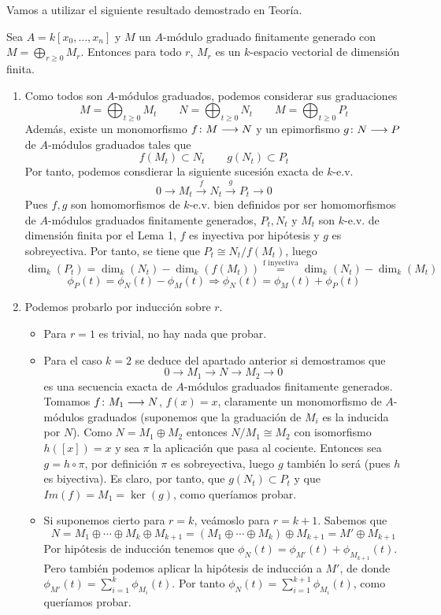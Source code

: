 \documentclass[twoside]{article}
\begin{document}
\begin{solucion}Vamos a utilizar el siguiente resultado demostrado en Teoría.
\begin{lemma}
Sea $A = k[x_0,\dots,x_n]$ y $M$ un $A$-módulo graduado finitamente generado con $M = \bigoplus_{r≥0} M_r$. Entonces para todo $r$, $M_r$ es un $k$-espacio vectorial de dimensión finita.
\end{lemma}
\begin{enumerate}
\item  Como todos son $A$-módulos graduados, podemos considerar sus graduaciones
$$
M=\bigoplus_{t\geq 0} M_t \qquad N=\bigoplus_{t\geq 0} N_t \qquad M=\bigoplus_{t\geq 0} P_t $$
Además, existe un monomorfismo $f\colon{M}\longrightarrow{N}$ y un epimorfismo $g\colon{N}\longrightarrow{P}$ de $A$-módulos graduados tales que
$$
f(M_t) \subset N_t \qquad g(N_t) \subset P_t
$$
Por tanto, podemos consdierar la siguiente sucesión exacta de $k$-e.v. 
$$0\to M_t\overset{f}{\to} N_t\overset{g}{\to} P_t \to 0$$
Pues $f,g$ son homomorfismos de $k$-e.v. bien definidos por ser homomorfismos de $A$-módulos graduados finitamente generados, $P_t,N_t$ y $M_t$ son $k$-e.v. de dimensión finita por el Lema 1, $f$ es inyectiva por hipótesis y $g$ es sobreyectiva. Por tanto, se tiene que $P_t \cong N_t/f(M_t)$, luego 
 $$
\dim_k(P_t) = \dim_k(N_t)-\dim_k(f(M_t)) \overset{\text{f inyectiva}}{=} \dim_k(N_t)-\dim_k(M_t)
$$
$$\phi_P(t) = \phi_N(t)-\phi_M(t) \Rightarrow \phi_N(t)=\phi_M(t)+\phi_P(t)$$
\item Podemos probarlo por inducción sobre $r$. 
\begin{itemize}
\item Para $r=1$ es trivial, no hay nada que probar. 
\item Para el caso $k=2$ se deduce del apartado anterior si demostramos que 
$$
0\to M_1 \to N \to M_2 \to 0$$
es una secuencia exacta de $A$-módulos graduados finitamente generados. Tomamos $f\colon{M_1}\longrightarrow{N}$, $f(x)=x$, claramente un monomorfismo de $A$-módulos graduados (suponemos que la graduación de $M_i$ es la inducida por $N$). Como $N=M_1\oplus M_2$ entonces $N/M_1\cong M_2$ con isomorfismo $h([x])=x$ y sea $\pi$ la aplicación que pasa al cociente. Entonces sea $g=h \circ \pi$, por definición $\pi$ es sobreyectiva, luego $g$ también lo será (pues $h$ es biyectiva). Es claro, por tanto, que $g(N_t)\subset P_t$ y que $Im(f)=M_1 = \ker(g)$, como queríamos probar.
\item Si suponemos cierto para $r=k$, veámoslo para $r=k+1$. Sabemos que
$$N=M_1 \oplus \cdots \oplus M_k \oplus M_{k+1} = (M_1 \oplus \cdots \oplus M_k) \oplus M_{k+1} = M' \oplus M_{k+1}$$
Por hipótesis de inducción tenemos que $\phi_N(t)=\phi_{M'}(t)+\phi_{M_{k+1}}(t)$. Pero también podemos aplicar la hipótesis de inducción a $M'$, de donde $\phi_{M'}(t)=\sum_{i=1}^k \phi_{M_i}(t)$. Por tanto $\phi_N(t)=\sum_{i=1}^{k+1}\phi_{M_i}(t)$, como queríamos probar.
\end{itemize}
\end{enumerate}
\end{solucion}
\end{document}

